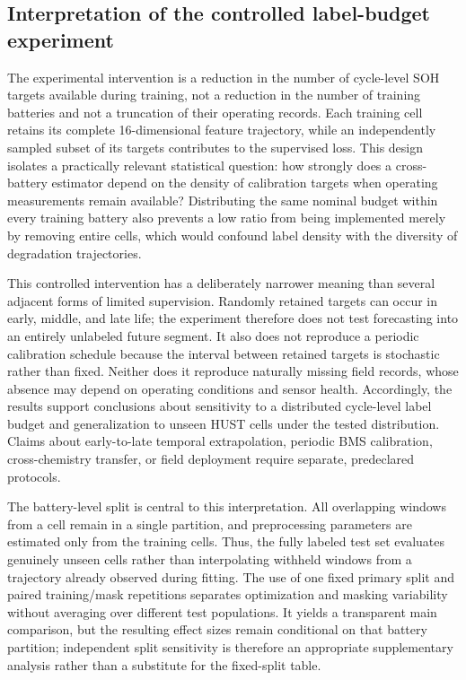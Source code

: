 \documentclass[pdflatex,sn-mathphys-num]{sn-jnl}
\begin{document}
\subsection{Interpretation of the controlled label-budget experiment}

The experimental intervention is a reduction in the number of cycle-level SOH targets available during training, not a reduction in the number of training batteries and not a truncation of their operating records. Each training cell retains its complete 16-dimensional feature trajectory, while an independently sampled subset of its targets contributes to the supervised loss. This design isolates a practically relevant statistical question: how strongly does a cross-battery estimator depend on the density of calibration targets when operating measurements remain available? Distributing the same nominal budget within every training battery also prevents a low ratio from being implemented merely by removing entire cells, which would confound label density with the diversity of degradation trajectories.

This controlled intervention has a deliberately narrower meaning than several adjacent forms of limited supervision. Randomly retained targets can occur in early, middle, and late life; the experiment therefore does not test forecasting into an entirely unlabeled future segment. It also does not reproduce a periodic calibration schedule because the interval between retained targets is stochastic rather than fixed. Neither does it reproduce naturally missing field records, whose absence may depend on operating conditions and sensor health. Accordingly, the results support conclusions about sensitivity to a distributed cycle-level label budget and generalization to unseen HUST cells under the tested distribution. Claims about early-to-late temporal extrapolation, periodic BMS calibration, cross-chemistry transfer, or field deployment require separate, predeclared protocols.

The battery-level split is central to this interpretation. All overlapping windows from a cell remain in a single partition, and preprocessing parameters are estimated only from the training cells. Thus, the fully labeled test set evaluates genuinely unseen cells rather than interpolating withheld windows from a trajectory already observed during fitting. The use of one fixed primary split and paired training/mask repetitions separates optimization and masking variability without averaging over different test populations. It yields a transparent main comparison, but the resulting effect sizes remain conditional on that battery partition; independent split sensitivity is therefore an appropriate supplementary analysis rather than a substitute for the fixed-split table.
\end{document}
